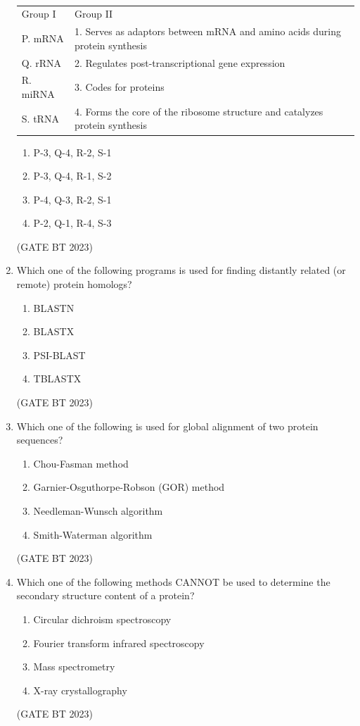 \documentclass[journal,12pt,onecolumn]{IEEEtran}
\begin{document}
\begin{enumerate}
\begin{table}[H]
\begin{tabular}{ll}
        Group I & Group II \\
        P. mRNA & 1. Serves as adaptors between mRNA and amino acids during protein synthesis \\
        Q. rRNA & 2. Regulates post-transcriptional gene expression \\
        R. miRNA & 3. Codes for proteins \\
        S. tRNA & 4. Forms the core of the ribosome structure and catalyzes protein synthesis \\
     \end{tabular}
     \caption{}
     \label{match the following}
    \end{table}
    
    
    \begin{enumerate}
        \item P-3, Q-4, R-2, S-1
        \item P-3, Q-4, R-1, S-2
        \item P-4, Q-3, R-2, S-1
        \item P-2, Q-1, R-4, S-3
    \end{enumerate}
    \hfill(GATE BT 2023)

    \item Which one of the following programs is used for finding distantly related (or remote) protein homologs?
    \begin{enumerate}
        \item BLASTN
        \item BLASTX
        \item PSI-BLAST
        \item TBLASTX
    \end{enumerate}
    \hfill(GATE BT 2023)

    \item Which one of the following is used for global alignment of two protein sequences?
    \begin{enumerate}
        \item Chou-Fasman method
        \item Garnier-Osguthorpe-Robson (GOR) method
        \item Needleman-Wunsch algorithm
        \item Smith-Waterman algorithm
    \end{enumerate}
    \hfill(GATE BT 2023)

    \item Which one of the following methods CANNOT be used to determine the secondary structure content of a protein?
    \begin{enumerate}
        \item Circular dichroism spectroscopy
        \item Fourier transform infrared spectroscopy
        \item Mass spectrometry
        \item X-ray crystallography
    \end{enumerate}
    \hfill(GATE BT 2023)


\end{enumerate}
\end{document}
